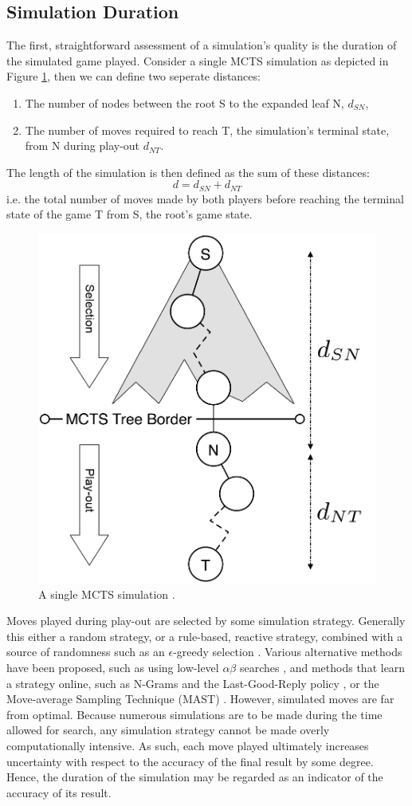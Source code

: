 \documentclass{ecai2014}
\newcommand{\node}[1]{{\fontfamily{phv}\selectfont#1}}
\begin{document}
\subsection{Simulation Duration} 
\label{sub:simdur}
The first, straightforward assessment of a simulation's quality is the duration of the simulated game played. Consider a single MCTS simulation as depicted in Figure \ref{fig:mcts-simulation}, then we can define two seperate distances: 
\begin{enumerate}
\item The number of nodes between the root \node{S} to the expanded leaf \node{N}, $d_{SN}$,
\item The number of moves required to reach \node{T}, the simulation's terminal state, from \node{N} during play-out $d_{NT}$.
\end{enumerate}
The length of the simulation is then defined as the sum of these distances:
\begin{equation}
d = d_{SN} + d_{NT}
\label{eq:m_ST}
\end{equation}
i.e. the total number of moves made by both players before reaching the terminal state of the game \node{T} from \node{S}, the root's game state.
\begin{figure}[t]
	\centering
	\includegraphics[width=.3\textwidth]{img/figure2_new.png}
	\caption{A single MCTS simulation \cite{finnsson2010learning}.}
	\label{fig:mcts-simulation}
\end{figure}
Moves played during play-out are selected by some simulation strategy. Generally this either a random strategy, or a rule-based, reactive strategy, combined with a source of randomness such as an $\epsilon$-greedy selection \cite{sturtevant2008analysis, sutton1998reinforcement}. Various alternative methods have been proposed, such as using low-level $\alpha\beta$ searches \cite{Winands2011}, and methods that learn a strategy online, such as N-Grams \cite{Tak2012} and the Last-Good-Reply policy \cite{baier2010power}, or the Move-average Sampling Technique (MAST) \cite{finnsson2008simulation}. However, simulated moves are far from optimal. Because numerous simulations are to be made during the time allowed for search, any simulation strategy cannot be made overly computationally intensive. As such, each move played ultimately increases uncertainty with respect to the accuracy of the final result by some degree. Hence, the duration of the simulation may be regarded as an indicator of the accuracy of its result.
\end{document}
